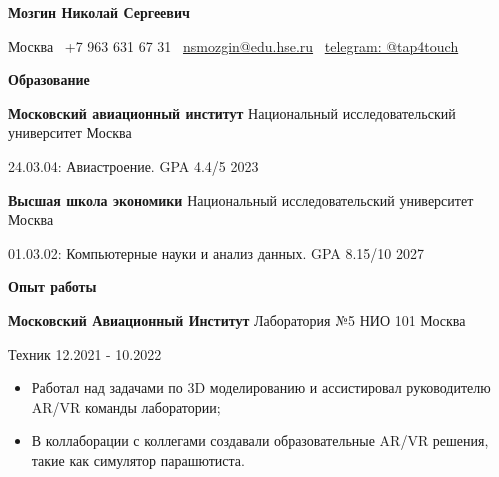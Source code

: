 \documentclass[12pt]{article}
\begin{document}
\begin{center}
    \textbf{Мозгин Николай Сергеевич}\\
    \hrulefill
\end{center}

\begin{center}
    Москва \textbullet \ +7 963 631 67 31 \textbullet \ \href{mailto:nsmozgin@edu.hse.ru}{nsmozgin@edu.hse.ru} \textbullet \ \href{http://t.me/tap4touch}{telegram: @tap4touch}
\end{center}

\vspace{1pt}

\begin{center}
    \textbf{Образование}
\end{center}
\textbf{Московский авиационный институт} \textcolor{gray!100}{Национальный исследовательский университет} \hfill Москва

24.03.04: Авиастроение. GPA 4.4/5 \hfill 2023

\vspace{12pt}

\textbf{Высшая школа экономики} \textcolor{gray!100}{Национальный исследовательский университет} \hfill Москва

01.03.02: Компьютерные науки и анализ данных. GPA 8.15/10 \hfill 2027

\vspace{12pt}

\begin{center}
    \textbf{Опыт работы}
\end{center}

\textbf{Московский Авиационный Институт} \textcolor{gray!100}{Лаборатория №5 НИО 101} \hfill Москва

Техник \hfill 12.2021 - 10.2022

\vspace{1pt}
\begin{itemize}[noitemsep, topsep=0pt, partopsep=0pt, parsep=0pt]

    \item Работал над задачами по 3D моделированию и ассистировал руководителю AR/VR команды 
    \mbox{лаборатории};
    \item В коллаборации с коллегами создавали образовательные AR/VR решения, такие как симулятор парашютиста.

\end{itemize}

\vspace{12pt}
\end{document}
